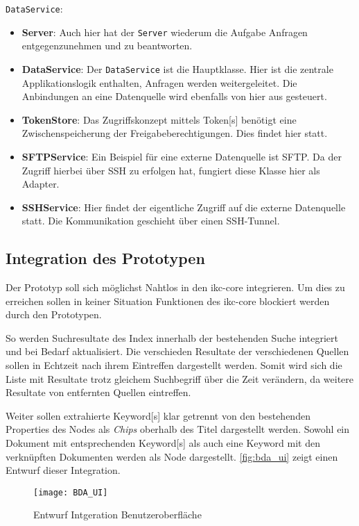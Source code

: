 \texttt{DataService}:
\begin{itemize}
    \item \textbf{Server}: Auch hier hat der \texttt{Server} wiederum die Aufgabe Anfragen entgegenzunehmen und zu beantworten.
    \item \textbf{DataService}: Der \texttt{DataService} ist die Hauptklasse. Hier ist die zentrale Applikationslogik enthalten, Anfragen werden weitergeleitet. Die Anbindungen an eine Datenquelle wird ebenfalls von hier aus gesteuert.
    \item \textbf{TokenStore}: Das Zugriffskonzept mittels \gls{Token}[s] benötigt eine Zwischenspeicherung der Freigabeberechtigungen. Dies findet hier statt. 
    \item \textbf{SFTPService}: Ein Beispiel für eine externe Datenquelle ist \gls{SFTP}. Da der Zugriff hierbei über \gls{SSH} zu erfolgen hat, fungiert diese Klasse hier als Adapter.
    \item \textbf{SSHService}: Hier findet der eigentliche Zugriff auf die externe Datenquelle statt. Die Kommunikation geschieht über einen \gls{SSH}-Tunnel.
\end{itemize}

\subsection{Integration des Prototypen}
Der Prototyp soll sich möglichst Nahtlos in den \gls{ikc-core} integrieren. Um dies zu erreichen sollen in keiner Situation Funktionen des \gls{ikc-core} blockiert werden durch den Prototypen. 

So werden Suchresultate des Index innerhalb der bestehenden Suche integriert und bei Bedarf aktualisiert. Die verschieden Resultate der verschiedenen Quellen sollen in Echtzeit nach ihrem Eintreffen dargestellt werden. Somit wird sich die Liste mit Resultate trotz gleichem Suchbegriff über die Zeit verändern, da weitere Resultate von entfernten Quellen eintreffen. 

Weiter sollen extrahierte \gls{Keyword}[s] klar getrennt von den bestehenden Properties des Nodes als \textit{Chips} oberhalb des Titel dargestellt werden. Sowohl ein Dokument mit entsprechenden \gls{Keyword}[s] als auch eine \gls{Keyword} mit den verknüpften Dokumenten werden als Node dargestellt. \autoref{fig:bda_ui} zeigt einen Entwurf dieser Integration. 

    \begin{figure}[H]
    \centering
    \texttt{[image: BDA\_UI]}
    \caption{Entwurf Intgeration Benutzeroberfläche}
    \label{fig:bda_ui}
    \end{figure}

